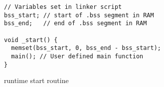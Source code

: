 \begin{listing}[H]
\begin{verbatim}
// Variables set in linker script
bss_start; // start of .bss segment in RAM
bss_end;   // end of .bss segment in RAM

void _start() {
  memset(bss_start, 0, bss_end - bss_start);
  main(); // User defined main function
}
\end{verbatim}
\caption{{\C} runtime start routine}
\label{lst:start}
\end{listing}
